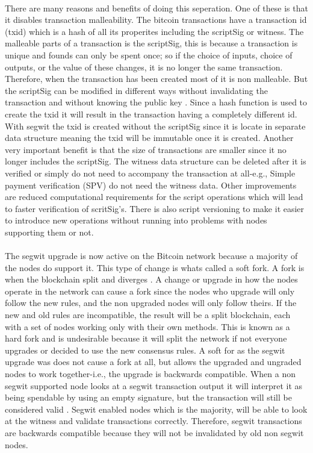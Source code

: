 \documentclass[informationsecurity]{gucmasterproject}
\begin{document}
\paragraph{}
There are many reasons and benefits of doing this seperation\cite{antonopoulos2017mastering}\cite{BC_segwit}. One of these is that it disables transaction malleability. The bitcoin transactions have a transaction id (txid) which is a hash of all its properites including the scriptSig or witness. The malleable parts of a transaction is the scriptSig, this is because a transaction is unique and founds can only be spent once; so if the choice of inputs, choice of outputs, or the value of these changes, it is no longer the same transaction.
Therefore, when the transaction has been created most of it is non malleable. But the scriptSig can be modified in different ways without invalidating the transaction and without knowing the public key \cite{BIP62}. Since a hash function is used to create the txid it will result in the transaction having a completely different id. With segwit the txid is created without the scriptSig since it is locate in separate data structure meaning the txid will be immutable once it is created. Another very important benefit is that the size of transactions are smaller since it no longer includes the scriptSig. The witness data structure can be deleted after it is verified or simply do not need to accompany the transaction at all-e.g., Simple payment verification (SPV) do not need the witness data.
Other improvements are reduced computational requirements for the script operations which will lead to faster verification of scritSig's.
There is also script versioning to make it easier to introduce new operations without running into problems with nodes supporting them or not.

\paragraph{}
The segwit upgrade is now active on the Bitcoin network because a majority of the nodes do support it. This type of change is whats called a soft fork. A fork is when the blockchain split and diverges \cite{antonopoulos2017mastering}. A change or upgrade in how the nodes operate in the network can cause a fork since the nodes who upgrade will only follow the new rules, and the non upgraded nodes will only follow theirs. If the new and old rules are incompatible, the result will be a split blockchain, each with a set of nodes working only with their own methods. This is known as a hard fork and is undesirable because it will split the network if not everyone upgrades or decided to use the new consensus rules. A soft for as the segwit upgrade was does not cause a fork at all, but allows the upgraded and ungraded nodes to work together-i.e., the upgrade is backwards compatible. When a non segwit supported node looks at a segwit transaction output it will interpret it as being spendable by using an empty signature, but the transaction will still be considered valid \cite{antonopoulos2017mastering}. Segwit enabled nodes which is the majority, will be able to look at the witness and validate transactions correctly. Therefore, segwit transactions are backwards compatible because they will not be invalidated by old non segwit nodes.
\end{document}
